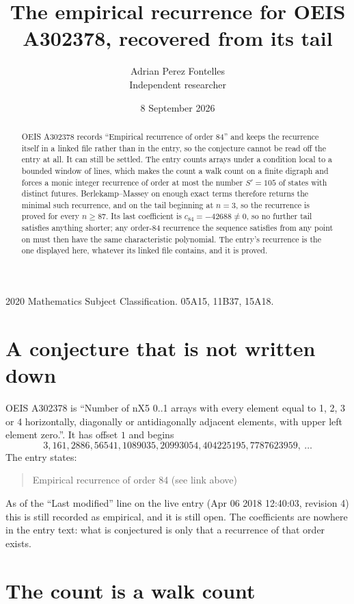 \documentclass[11pt,a4paper]{article}
\title{The empirical recurrence for OEIS A302378, recovered from its tail}
\author{Adrian Perez Fontelles\\ \small Independent researcher}
\date{8 September 2026}
\theoremstyle{plain}
\theoremstyle{definition}
\begin{document}
\maketitle

\begin{abstract}
OEIS A302378 records ``Empirical recurrence of order $84$'' and keeps the recurrence itself in
a linked file rather than in the entry, so the conjecture cannot be read off the entry at all.
It can still be settled. The entry counts arrays under a condition local to a bounded window of
lines, which makes the count a walk count on a finite digraph and forces a monic integer
recurrence of order at most the number $S'=105$ of states with distinct futures. Berlekamp--Massey on
enough exact terms therefore returns the minimal such recurrence, and on the tail beginning at $n=3$, so the recurrence is proved for every $n\ge87$.
Its last coefficient is $c_{84}=-42688\neq0$, so no further tail satisfies anything
shorter; any order-$84$ recurrence the sequence satisfies from any point on must then have
the same characteristic polynomial. The entry's recurrence is the one displayed here, whatever
its linked file contains, and it is proved.
\end{abstract}

\noindent\small 2020 Mathematics Subject Classification. 05A15, 11B37, 15A18.\normalsize

\section{A conjecture that is not written down}

OEIS A302378 is ``Number of nX5 0..1 arrays with every element equal to 1, 2, 3 or 4 horizontally, diagonally or antidiagonally adjacent elements, with upper left element zero.''. It has offset $1$ and begins
\[
3, 161, 2886, 56541, 1089035, 20993054, 404225195, 7787623959,\ \dots
\]
The entry states:
\begin{quote}
Empirical recurrence of order 84 (see link above)
\end{quote}
As of the ``Last modified'' line on the live entry (Apr 06 2018 12:40:03, revision 4)
this is still recorded as empirical, and it is still open. The coefficients are nowhere in the
entry text: what is conjectured is only that a recurrence of that order exists.

\section{The count is a walk count}
\end{document}
